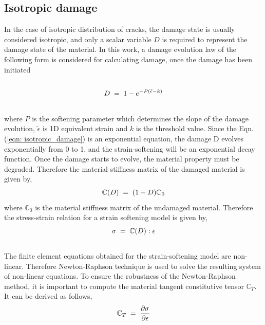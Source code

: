 \documentclass[a4paper,12pt,twoside]{report}
\begin{document}
\subsection{Isotropic damage}
\indent\indent\indent In the case of isotropic distribution of cracks, the damage state is usually considered isotropic, and only a scalar variable $D$ is required to represent the damage state of the material. In this work, a damage evolution law of the following form is considered for calculating damage, once the damage has been initiated
\\
\\
\begin{equation}
  \large{ D \; = \; 1 - e^{-P(\tilde{\epsilon} - k)}}
  \label{eqn: isotropic_damage}
\end{equation} 
\\
where $P$ is the softening parameter which determines the slope of the damage evolution, $\tilde{\epsilon}$ is 1D equivalent strain and $k$ is the threshold value. Since the Eqn. (\ref{eqn: isotropic_damage}) is an exponential equation, the damage D evolves exponentially from 0 to 1, and the strain-softening will be an exponential decay function. Once the damage starts to evolve, the material property must be degraded. Therefore the material stiffness matrix of the  damaged material is given by,\\
\begin{equation}
\large{\mathbb{C}(D) \; = \; (1  - D) \mathbb{C}_{0} }
\end{equation} 
where $\mathbb{C}_{0}$ is the material stiffness matrix of the undamaged material. Therefore the stress-strain relation for a strain softening model is given by,\\
\begin{equation}
\large{\sigma \; = \; \mathbb{C}(D) : \epsilon }  
\end{equation}
\\
The finite element equations obtained for the strain-softening model are non-linear. Therefore Newton-Raphson technique is used to solve the resulting system of non-linear equations. To ensure the robustness of the Newton-Raphson method, it is important to compute the material tangent constitutive tensor $\mathbb{C}_{T}$. It can be derived as follows,\\
\begin{equation*}
\large{ \mathbb{C}_{T}  \; = \;\frac{\partial \sigma}{\partial \epsilon}  }
\end{equation*}
\end{document}
